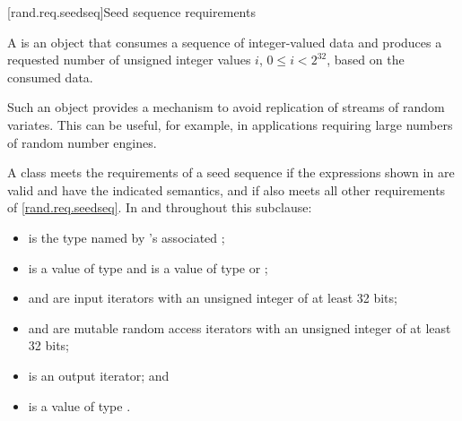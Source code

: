 
[rand.req.seedseq]{Seed sequence requirements}%
%

\pnum
 A 
 is an object
 that consumes a sequence
 of integer-valued data
 and produces a requested number
 of unsigned integer values $i$, $0 \le i < 2^{32}$,
 based on the consumed data.
\begin{note}
 Such an object provides a mechanism
 to avoid replication of streams of random variates.
 This can be useful, for example, in applications
 requiring large numbers of random number engines.
\end{note}

\pnum
A class 
meets the requirements
of a seed sequence
if the expressions shown
in 
are valid and have the indicated semantics,
and if  also meets all other requirements
of \ref{rand.req.seedseq}.
In  and throughout this subclause:
\begin{itemize}
  \item
     is the type named by
    's associated ;
  \item
     is a value of type 
    and
     is a value of type  or ;
  \item
     and  are input iterators
    with an unsigned integer  of at least 32 bits;
  \item
     and  are mutable random access iterators
    with an unsigned integer  of at least 32 bits;
  \item
     is an output iterator;
  and
  \item
     is a value of type .
\end{itemize}


